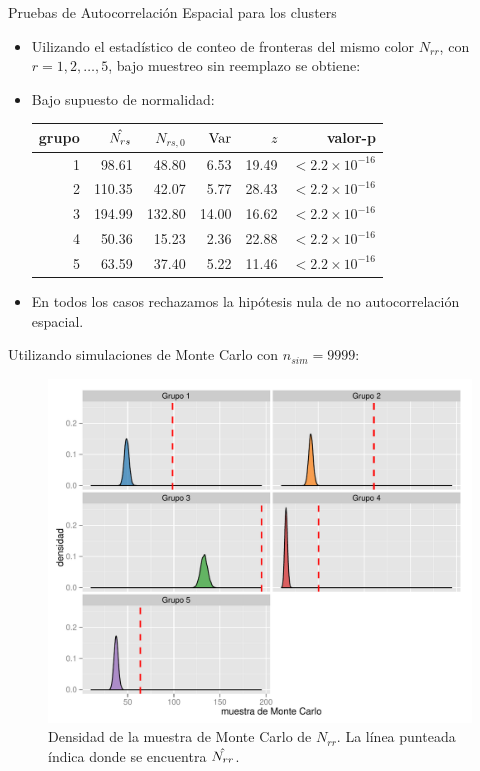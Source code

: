 \documentclass{beamer}
\def\Var{{\rm{Var}}}
\begin{document}
\begin{frame}{Pruebas de Autocorrelación Espacial para los clusters}
  \begin{itemize}
    \item Uilizando el estadístico de conteo de fronteras del mismo color $N_{rr}$, con $r=1,2,\dots,5$, bajo muestreo sin reemplazo se obtiene:
    \item Bajo supuesto de normalidad:
    \begin{table}[ht]
      \centering
      \begin{tabular}{rrrrrr}
        \hline
        grupo & $\Hat{N_{rs}}$  & $N_{rs,0}$ & $\Var$ & $z$ & valor-p \\ 
        \hline
        1 & 98.61 & 48.80 & 6.53 & 19.49 & $< 2.2 \times 10^{-16}$ \\ 
        2 & 110.35 & 42.07 & 5.77  & 28.43 & $< 2.2 \times 10^{-16}$ \\ 
        3 & 194.99 & 132.80 & 14.00 & 16.62 & $< 2.2 \times 10^{-16}$ \\ 
        4 & 50.36 & 15.23 & 2.36 & 22.88 & $< 2.2 \times 10^{-16}$ \\ 
        5 & 63.59 & 37.40 & 5.22 & 11.46 & $< 2.2 \times 10^{-16}$ \\ 
         \hline
      \end{tabular}
    \end{table}
    \item En todos los casos rechazamos la hipótesis nula de no autocorrelación espacial.
  \end{itemize}

\end{frame}

\begin{frame}
Utilizando simulaciones de Monte Carlo con $n_{sim}=9999$:
  \begin{figure}[!ht]
    \centering
    \includegraphics[width=.6\textwidth]{./plots/jc_density.pdf}
    \caption{Densidad de la muestra de Monte Carlo de $N_{rr}$. La línea punteada índica donde se encuentra $\Hat{N_{rr}}$. \label{obj:jcdensity} }
  \end{figure}
\end{frame}
\end{document}
